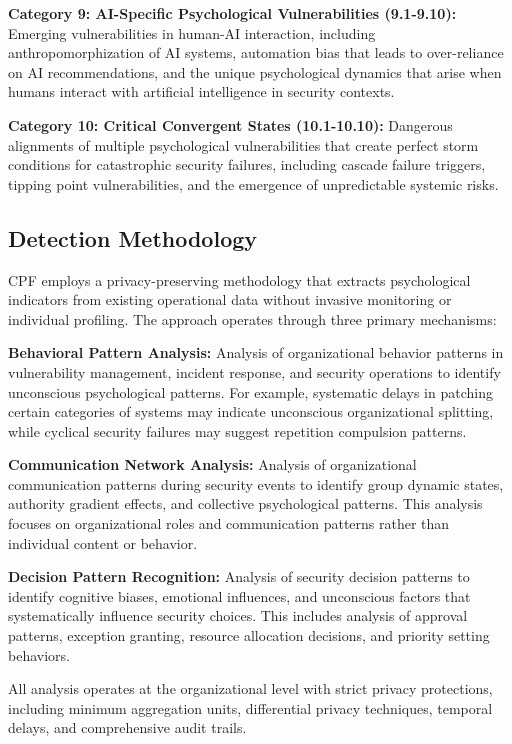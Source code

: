 \documentclass[10pt, twocolumn]{article}
\begin{document}
\textbf{Category 9: AI-Specific Psychological Vulnerabilities (9.1-9.10):} Emerging vulnerabilities in human-AI interaction, including anthropomorphization of AI systems, automation bias that leads to over-reliance on AI recommendations, and the unique psychological dynamics that arise when humans interact with artificial intelligence in security contexts.

\textbf{Category 10: Critical Convergent States (10.1-10.10):} Dangerous alignments of multiple psychological vulnerabilities that create perfect storm conditions for catastrophic security failures, including cascade failure triggers, tipping point vulnerabilities, and the emergence of unpredictable systemic risks.

\subsection{Detection Methodology}

CPF employs a privacy-preserving methodology that extracts psychological indicators from existing operational data without invasive monitoring or individual profiling. The approach operates through three primary mechanisms:

\textbf{Behavioral Pattern Analysis:} Analysis of organizational behavior patterns in vulnerability management, incident response, and security operations to identify unconscious psychological patterns. For example, systematic delays in patching certain categories of systems may indicate unconscious organizational splitting, while cyclical security failures may suggest repetition compulsion patterns.

\textbf{Communication Network Analysis:} Analysis of organizational communication patterns during security events to identify group dynamic states, authority gradient effects, and collective psychological patterns. This analysis focuses on organizational roles and communication patterns rather than individual content or behavior.

\textbf{Decision Pattern Recognition:} Analysis of security decision patterns to identify cognitive biases, emotional influences, and unconscious factors that systematically influence security choices. This includes analysis of approval patterns, exception granting, resource allocation decisions, and priority setting behaviors.

All analysis operates at the organizational level with strict privacy protections, including minimum aggregation units, differential privacy techniques, temporal delays, and comprehensive audit trails.
\end{document}
